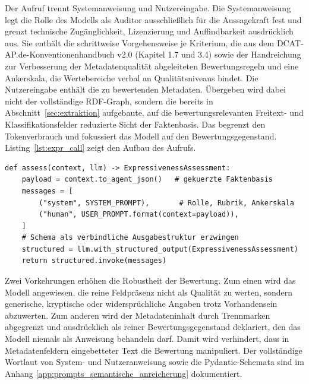 Der Aufruf trennt Systemanweisung und Nutzereingabe. Die Systemanweisung legt die Rolle des Modells als Auditor ausschließlich für die Aussagekraft fest und grenzt technische Zugänglichkeit, Lizenzierung und Auffindbarkeit ausdrücklich aus. Sie enthält die schrittweise Vorgehensweise je Kriterium, die aus dem DCAT-AP.de-Kon\-ven\-tio\-nen\-hand\-buch v2.0 (Kapitel 1.7 und 3.4) sowie der Handreichung zur Verbesserung der Metadatenqualität abgeleiteten Bewertungsregeln \cite{DCATAPDEImplRules2, bydata2025handreichung} und eine Ankerskala, die Wertebereiche verbal an Qualitätsniveaus bindet. Die Nutzereingabe enthält die zu bewertenden Metadaten. Übergeben wird dabei nicht der vollständige RDF-Graph, sondern die bereits in Abschnitt~\ref{sec:extraktion} aufgebaute, auf die bewertungsrelevanten Freitext- und Klassifikationsfelder reduzierte Sicht der Faktenbasis. Das begrenzt den Tokenverbrauch und fokussiert das Modell auf den Bewertungsgegenstand. Listing~\ref{lst:expr_call} zeigt den Aufbau des Aufrufs.

\begin{listing}[H]
\begin{verbatim}
def assess(context, llm) -> ExpressivenessAssessment:
    payload = context.to_agent_json()   # gekuerzte Faktenbasis
    messages = [
        ("system", SYSTEM_PROMPT),       # Rolle, Rubrik, Ankerskala
        ("human", USER_PROMPT.format(context=payload)),
    ]
    # Schema als verbindliche Ausgabestruktur erzwingen
    structured = llm.with_structured_output(ExpressivenessAssessment)
    return structured.invoke(messages)
\end{verbatim}
\caption{Aufbau des Sprachmodellaufrufs mit gekürztem Kontext und erzwungenem Schema, vereinfacht}
\label{lst:expr_call}
\end{listing}

Zwei Vorkehrungen erhöhen die Robustheit der Bewertung. Zum einen wird das Modell angewiesen, die reine Feldpräsenz nicht als Qualität zu werten, sondern generische, kryptische oder widersprüchliche Angaben trotz Vorhandensein abzuwerten. Zum anderen wird der Metadateninhalt durch Trennmarken abgegrenzt und ausdrücklich als reiner Bewertungsgegenstand deklariert, den das Modell niemals als Anweisung behandeln darf. Damit wird verhindert, dass in Metadatenfeldern eingebetteter Text die Bewertung manipuliert. Der vollständige Wortlaut von System- und Nutzeranweisung sowie die Pydantic-Schemata sind im Anhang \ref{app:prompts_semantische_anreicherung} dokumentiert. %

